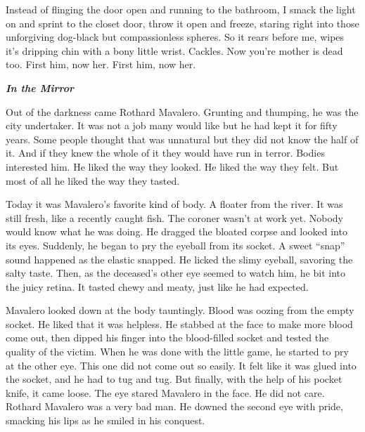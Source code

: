 Instead of flinging the door open and running to the bathroom, I
smack the light on and sprint to the closet door, throw it open and
freeze, staring right into those unforgiving dog-black but
compassionless spheres. So it rears before me, wipes it's
dripping chin with a bony little wrist. Cackles. Now you're
mother is dead too. First him, now her. First him, now her. 

 





{\bf {\em In the Mirror}}



Out of the darkness came Rothard Mavalero. Grunting and thumping,
he was the city undertaker. It was not a job many would like but he
had kept it for fifty years. Some people thought that was unnatural
but they did not know the half of it. And if they knew the whole of
it they would have run in terror. Bodies interested him. He liked
the way they looked. He liked the way they felt. But most of all he
liked the way they tasted.



Today it was Mavalero's favorite kind of body. A floater from the
river. It was still fresh, like a recently caught fish. The coroner
wasn't at work yet. Nobody would know what he was doing. He dragged
the bloated corpse and looked into its eyes. Suddenly, he began to
pry the eyeball from its socket. A sweet ``snap'' sound happened as
the elastic snapped. He licked the slimy eyeball, savoring the
salty taste. Then, as the deceased's other eye seemed to watch him,
he bit into the juicy retina. It tasted chewy and meaty, just like
he had expected.



Mavalero looked down at the body tauntingly. Blood was oozing from
the empty socket. He liked that it was helpless. He stabbed at the
face to make more blood come out, then dipped his finger into the
blood-filled socket and tested the quality of the victim. When he
was done with the little game, he started to pry at the other eye.
This one did not come out so easily. It felt like it was glued into
the socket, and he had to tug and tug. But finally, with the help
of his pocket knife, it came loose. The eye stared Mavalero in the
face. He did not care. Rothard Mavalero was a very bad man. He
downed the second eye with pride, smacking his lips as he smiled in
his conquest.



